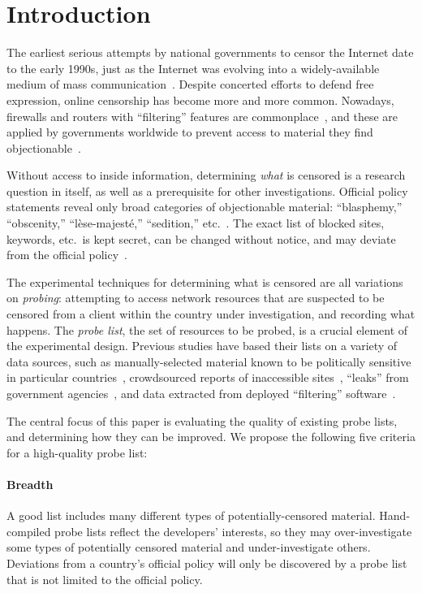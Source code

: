 \section{Introduction}\label{s:intro}

The earliest serious attempts by national governments to censor the
Internet date to the early 1990s, just as the Internet was evolving
into a widely-available medium of mass
communication~\cite{subramanian.2011.survey}. Despite concerted
efforts to defend free expression, online censorship has become more
and more common.  Nowadays, firewalls and routers with “filtering”
features are commonplace~\cite{gallagher.2012.budget-bb}, and these
are applied by governments worldwide to prevent access to material
they find objectionable~\cite{oni2008denied,aase2012whiskey}.

Without access to inside information, determining \emph{what} is
censored is a research question in itself, as well as a prerequisite
for other investigations.  Official policy statements reveal only
broad categories of objectionable material: “blasphemy,”
“obscenity,” “lèse-majesté,” “sedition,”
etc.~\cite{oni2008denied,oni.nd.profiles}.  The exact list of blocked
sites, keywords, etc.\ is kept secret, can be changed without notice,
and may deviate from the official policy~\cite{gill.2015.worldwide}.

The experimental techniques for determining what is censored are all
variations on \emph{probing}: attempting to access network resources
that are suspected to be censored from a client within the country
under investigation, and recording what happens.  The \emph{probe
  list}, the set of resources to be probed, is a crucial element of
the experimental design.  Previous studies have based their lists on a
variety of data sources, such as manually-selected material known to
be politically sensitive in particular
countries~\cite{oni.nd.testlists}, crowdsourced reports of
inaccessible sites~\cite{berkman.nd.herdict}, “leaks” from
government agencies~\cite{chaabane.2014.syria}, and data extracted
from deployed “filtering” software~\cite{knockel.2011.skype}.

The central focus of this paper is evaluating the quality of existing
probe lists, and determining how they can be improved.  We propose the
following five criteria for a high-quality probe list:

\paragraph{Breadth} A good list includes many different types of
potentially-censored material.  Hand-compiled probe lists reflect the
developers' interests, so they may over-investigate some types of
potentially censored material and under-investigate others.
Deviations from a country's official policy will only be discovered by
a probe list that is not limited to the official policy.

